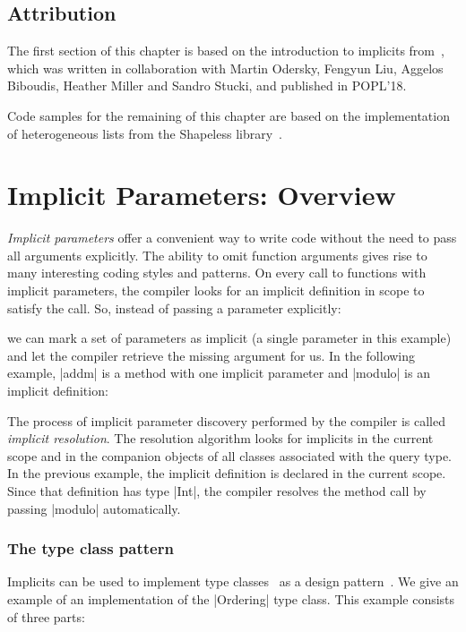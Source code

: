 \subsection*{Attribution}

The first section of this chapter is based on the introduction to implicits from~\citep{odersky2018simplicitly}, which was written in collaboration with Martin Odersky, Fengyun Liu, Aggelos Biboudis, Heather Miller and Sandro Stucki, and published in POPL'18.

Code samples for the remaining of this chapter are based on the implementation of heterogeneous lists from the Shapeless library~\citep{sabin2011shapeless}.

\section{Implicit Parameters: Overview}

\emph{Implicit parameters} offer a convenient way to write code without the need to pass all arguments explicitly.
The ability to omit function arguments gives rise to many interesting coding styles and patterns.
On every call to functions with implicit parameters, the compiler looks for an implicit definition in scope to satisfy the call.
So, instead of passing a parameter explicitly:

\explicitModulo

\noindent
we can mark a set of parameters as implicit (a single parameter in this example) and let the compiler retrieve the missing argument for us.
In the following example, |addm| is a method with one implicit parameter and |modulo| is an implicit definition:

\implicitModulo

The process of implicit parameter discovery performed by the compiler is called \emph{implicit resolution}.
The resolution algorithm looks for implicits in the current scope and in the companion objects of all classes associated with the query type.
In the previous example, the implicit definition is declared in the current scope.
Since that definition has type |Int|, the compiler resolves the method call by passing |modulo| automatically.

\subsubsection{The type class pattern}

Implicits can be used to implement type classes~\citep{wadler1989how} as a design pattern~\citep{oliveira2010type}.
We give an example of an implementation of the |Ordering| type class.
This example consists of three parts:


